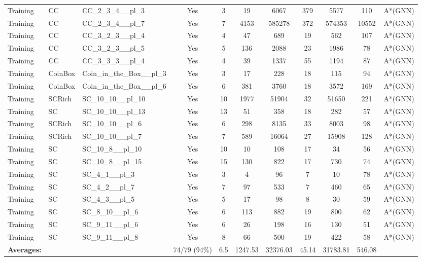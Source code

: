 \documentclass{article}
\begin{document}
\begin{tabular}{lllcccccccc}
Training & CC & CC\_2\_3\_4\_\_pl\_3 & Yes & 3 & 19 & 6067 & 379 & 5577 & 110 & A*(GNN) \\
Training & CC & CC\_2\_3\_4\_\_pl\_7 & Yes & 7 & 4153 & 585278 & 372 & 574353 & 10552 & A*(GNN) \\
Training & CC & CC\_3\_2\_3\_\_pl\_4 & Yes & 4 & 47 & 689 & 19 & 562 & 107 & A*(GNN) \\
Training & CC & CC\_3\_2\_3\_\_pl\_5 & Yes & 5 & 136 & 2088 & 23 & 1986 & 78 & A*(GNN) \\
Training & CC & CC\_3\_3\_3\_\_pl\_4 & Yes & 4 & 39 & 1337 & 55 & 1194 & 87 & A*(GNN) \\
Training & CoinBox & Coin\_in\_the\_Box\_\_pl\_3 & Yes & 3 & 17 & 228 & 18 & 115 & 94 & A*(GNN) \\
Training & CoinBox & Coin\_in\_the\_Box\_\_pl\_6 & Yes & 6 & 381 & 3760 & 18 & 3572 & 169 & A*(GNN) \\
Training & SCRich & SC\_10\_10\_\_pl\_10 & Yes & 10 & 1977 & 51904 & 32 & 51650 & 221 & A*(GNN) \\
Training & SC & SC\_10\_10\_\_pl\_13 & Yes & 13 & 51 & 358 & 18 & 282 & 57 & A*(GNN) \\
Training & SCRich & SC\_10\_10\_\_pl\_6 & Yes & 6 & 298 & 8135 & 33 & 8003 & 98 & A*(GNN) \\
Training & SCRich & SC\_10\_10\_\_pl\_7 & Yes & 7 & 589 & 16064 & 27 & 15908 & 128 & A*(GNN) \\
Training & SC & SC\_10\_8\_\_pl\_10 & Yes & 10 & 10 & 108 & 17 & 34 & 56 & A*(GNN) \\
Training & SC & SC\_10\_8\_\_pl\_15 & Yes & 15 & 130 & 822 & 17 & 730 & 74 & A*(GNN) \\
Training & SC & SC\_4\_1\_\_pl\_3 & Yes & 3 & 4 & 96 & 7 & 10 & 78 & A*(GNN) \\
Training & SC & SC\_4\_2\_\_pl\_7 & Yes & 7 & 97 & 533 & 7 & 460 & 65 & A*(GNN) \\
Training & SC & SC\_4\_3\_\_pl\_5 & Yes & 5 & 17 & 98 & 8 & 30 & 59 & A*(GNN) \\
Training & SC & SC\_8\_10\_\_pl\_6 & Yes & 6 & 113 & 882 & 19 & 800 & 62 & A*(GNN) \\
Training & SC & SC\_9\_11\_\_pl\_6 & Yes & 6 & 26 & 198 & 16 & 130 & 51 & A*(GNN) \\
Training & SC & SC\_9\_11\_\_pl\_8 & Yes & 8 & 66 & 500 & 19 & 422 & 58 & A*(GNN) \\
\textbf{Averages:} & & & 74/79 (94\%) & 6.5 & 1247.53 & 32376.03 & 45.14 & 31783.81 & 546.08 & \\
\bottomrule
\end{tabular}
\newpage
\end{document}
